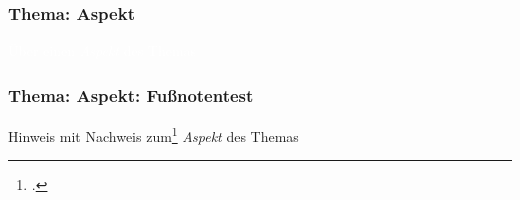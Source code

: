 
{
\begin{frame}  
  \frametitle{Thema: Aspekt}

  \vspace{4cm}
  \begin{flushright}
    \textcolor{white}{Über einen \textit{Aspekt} des Themas}
  \end{flushright}
\end{frame}
}

\begin{frame}  
  \frametitle{Thema: Aspekt: Fußnotentest}

  \vspace{4cm}
  \begin{flushright}
    Hinweis mit Nachweis zum\footcite[vgl.][17]{RlpIt2019a} \textit{Aspekt} des Themas
  \end{flushright}
\end{frame}